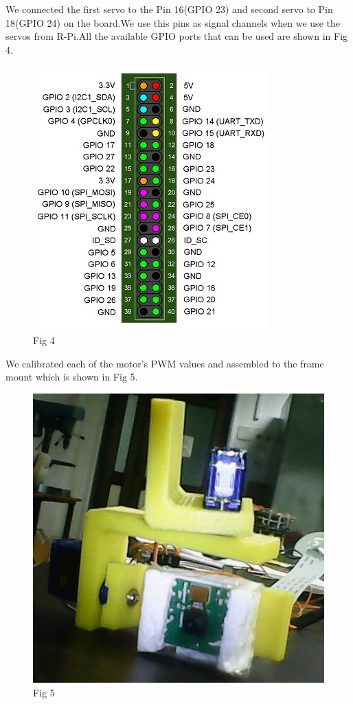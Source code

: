 \documentclass[a4paper,12pt,oneside]{book}
\begin{document}
		\par We connected the first servo to the Pin 16(GPIO 23) and second servo to Pin 18(GPIO 24) on the board.We use this pins as signal channels when we use the servos from R-Pi.All the available GPIO ports that can be used are shown in Fig 4.
		
	    \begin{figure}[h!]
         \includegraphics[scale=0.6]{gpio.jpg}
         \centering
         \caption{Fig 4}
        \end{figure}
		
		\par We calibrated each of the motor's PWM values and assembled to the frame mount which is shown in Fig 5.
		\begin{figure}[h!]
         \includegraphics[scale=0.6]{frame.jpg}
         \centering
         \caption{Fig 5}
        \end{figure}
\end{document}
